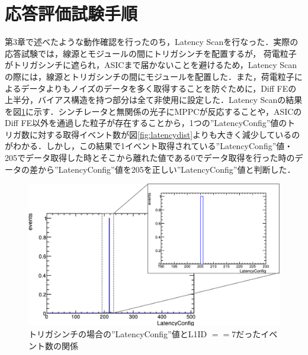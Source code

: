 \section{応答評価試験手順}
\label{sec:exthow}

第3章で述べたような動作確認を行ったのち，Latency Scanを行なった．実際の応答試験では，線源とモジュールの間にトリガシンチを配置するが， 荷電粒子がトリガシンチに遮られ，ASICまで届かないことを避けるため，Latency Scanの際には，線源とトリガシンチの間にモジュールを配置した．また，荷電粒子によるデータよりもノイズのデータを多く取得することを防ぐために，Diff FEの上半分，バイアス構造を持つ部分は全て非使用に設定した．Latency Scanの結果を図\ref{fig:exttriglatency}に示す．シンチレータと無関係の光子にMPPCが反応することや，ASICのDiff FE以外を通過した粒子が存在することから，1つの''LatencyConfig''値のトリガ数に対する取得イベント数が図\ref{fig:latencydist}よりも大きく減少しているのがわかる．しかし，この結果で1イベント取得されている''LatencyConfig''値・205でデータ取得した時とそこから離れた値である0でデータ取得を行った時のデータの差から''LatencyConfig''値を205を正しい''LatencyConfig''値と判断した．

\begin{figure}[h]
  \centering
  \includegraphics[width=14cm]{./figure/ExtLatencyDist.png}
  \caption{トリガシンチの場合の''LatencyConfig''値とL1ID $== 7$だったイベント数の関係}
  \label{fig:exttriglatency}
\end{figure}

